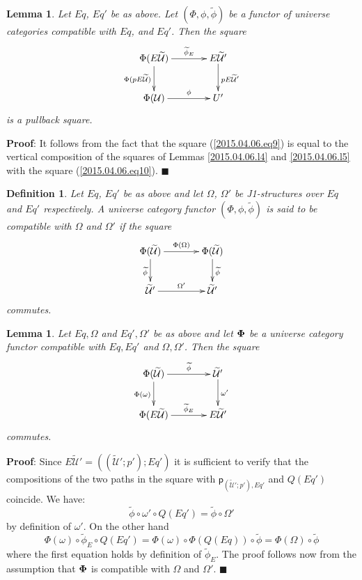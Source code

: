 \documentclass[12pt]{article}
\numberwithin{equation}{section}
\newenvironment{eq}{\begin{equation}}{\end{equation}}
\newenvironment{myproof}{{\bf Proof}:}{$\blacksquare$ \vskip 5mm }
\newtheorem{lemma}[proposition]{Lemma}
\newtheorem{definition}[proposition]{Definition}
\newcommand{\llabel}[1]{\label{#1}}
\newcommand{\wt}{\widetilde}
\newcommand{\p}{\mathsf{p}}
\newcommand{\U}{\mathcal{U}}
\begin{document}
%
\begin{lemma}
\llabel{2015.04.06.l6} Let $Eq$, $Eq'$ be as above. Let $(\Phi,\phi,\wt{\phi})$
be a functor of universe categories compatible with $Eq$, and $Eq'$. Then the
square
%
\begin{eq}\llabel{2015.04.06.eq9}
\begin{xy}
          \xymatrix@C=3pc{ \Phi(E\wt{\U}) \ar[r]^-{\wt{\phi}_{E}}
            \ar[d]_{\Phi(pE\wt{\U})} & E\wt{\U}' \ar[d]^{pE\wt{\U}'}\\ \Phi(\U)
            \ar[r]^-{\phi} & U' }
\end{xy}
\end{eq}
%
is a pullback square.
%
\end{lemma} 
%
\begin{myproof}
It follows from the fact that the square (\ref{2015.04.06.eq9}) is equal to the
vertical composition of the squares of Lemmas \ref{2015.04.06.l4} and
\ref{2015.04.06.l5} with the square (\ref{2015.04.06.eq10}).
\end{myproof}
%


\begin{definition}
\llabel{2015.04.06.def5} Let $Eq$, $Eq'$ be as above and let $\Omega$,
$\Omega'$ be J1-structures over $Eq$ and $Eq'$ respectively. A universe
category functor $(\Phi,\phi,\wt{\phi})$ is said to be compatible with $\Omega$
and $\Omega'$ if the square
%
$$
\begin{xy}
          \xymatrix@C=3pc{ \Phi(\wt{\U}) \ar[r]^-{\Phi(\Omega)}
            \ar[d]_{\wt{\phi}} & \Phi(\wt{\U})\ar[d]^{\wt{\phi}}\\ \wt{\U}'
            \ar[r]^-{\Omega'} & \wt{\U}' }
\end{xy}
$$
%
commutes.
\end{definition}
%
\begin{lemma}
\llabel{2015.04.10.l7} Let $Eq,\Omega$ and $Eq',\Omega'$ be as above and let
${\bf\Phi}$ be a universe category functor compatible with $Eq,Eq'$ and
$\Omega,\Omega'$. Then the square
%
$$
\begin{xy}
          \xymatrix@C=3pc{ \Phi(\wt{\U}) \ar[r]^-{\wt{\phi}}
            \ar[d]_{\Phi(\omega)} & \wt{\U}'\ar[d]^-{\omega'}\\ \Phi(E\wt{\U})
            \ar[r]^-{\wt{\phi}_{E}} & E\wt{\U}' }
\end{xy}
$$
%
commutes.
\end{lemma}
%
\begin{myproof}
Since $E\wt{\U}'=((\wt{\U}';p');Eq')$ it is sufficient to verify that the
compositions of the two paths in the square with $\p_{(\wt{\U}';p'),Eq'}$ and
$Q(Eq')$ coincide. We have:
%
$$\wt{\phi}\circ\omega'\circ Q(Eq')=\wt{\phi}\circ\Omega'$$
%
by definition of $\omega'$. On the other hand
%
$$\Phi(\omega)\circ \wt{\phi}_{E}\circ Q(Eq')=\Phi(\omega)\circ
\Phi(Q(Eq))\circ \wt{\phi}=\Phi(\Omega)\circ\wt{\phi}$$
%
where the first equation holds by definition of $\wt{\phi}_{E}$. The proof
follows now from the assumption that ${\bf\Phi}$ is compatible with $\Omega$
and $\Omega'$.
\end{myproof}
%
\end{document}
